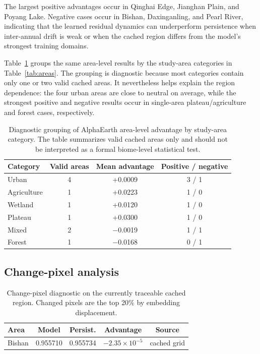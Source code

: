 \documentclass{article}
\begin{document}
The largest positive advantages occur in Qinghai Edge, Jianghan Plain, and Poyang Lake. Negative cases occur in Bishan, Daxinganling, and Pearl River, indicating that the learned residual dynamics can underperform persistence when inter-annual drift is weak or when the cached region differs from the model's strongest training domains.

Table~\ref{tab:category_diagnostic} groups the same area-level results by the study-area categories in Table~\ref{tab:areas}. The grouping is diagnostic because most categories contain only one or two valid cached areas. It nevertheless helps explain the region dependence: the four urban areas are close to neutral on average, while the strongest positive and negative results occur in single-area plateau/agriculture and forest cases, respectively.

\begin{table}[htbp]
\centering
\caption{Diagnostic grouping of AlphaEarth area-level advantage by study-area category. The table summarizes valid cached areas only and should not be interpreted as a formal biome-level statistical test.}
\label{tab:category_diagnostic}
\small
\begin{tabular}{lccc}
\toprule
Category & Valid areas & Mean advantage & Positive / negative \\
\midrule
Urban & 4 & +0.0009 & 3 / 1 \\
Agriculture & 1 & +0.0223 & 1 / 0 \\
Wetland & 1 & +0.0120 & 1 / 0 \\
Plateau & 1 & +0.0300 & 1 / 0 \\
Mixed & 2 & $-$0.0019 & 1 / 1 \\
Forest & 1 & $-$0.0168 & 0 / 1 \\
\bottomrule
\end{tabular}
\end{table}

\subsection{Change-pixel analysis}

\begin{table}[htbp]
\centering
\caption{Change-pixel diagnostic on the currently traceable cached region. Changed pixels are the top 20\% by embedding displacement.}
\label{tab:changepixel}
\begin{tabular}{lcccc}
\toprule
Area & Model & Persist. & Advantage & Source \\
\midrule
Bishan & 0.955710 & 0.955734 & $-2.35 \times 10^{-5}$ & cached grid \\
\bottomrule
\end{tabular}
\end{table}
\end{document}
